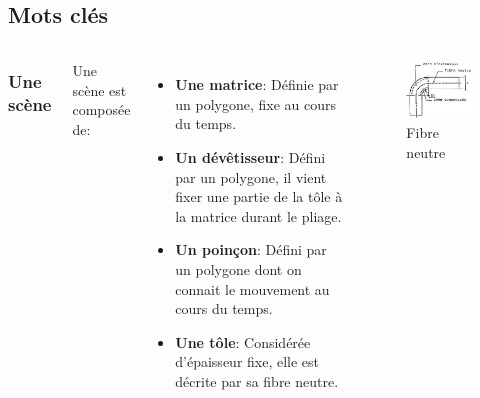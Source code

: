 \documentclass{beamer}
\begin{document}
\subsection{Mots clés}
\begin{frame}
    \begin{columns}
        \frametitle{Une scène}
        Une scène est composée de:
        \begin{itemize}
            \item \textbf{Une matrice}: 
                Définie par un polygone, fixe au cours du temps.
            \item \textbf{Un dévêtisseur}:
                Défini par un polygone, il vient fixer une partie de la tôle à la matrice durant le pliage.
            \item \textbf{Un poinçon}:
                Défini par un polygone dont on connait le mouvement au cours du temps.
            \item \textbf{Une tôle}:
                Considérée d'épaisseur fixe, elle est décrite par sa fibre neutre.
        \end{itemize}
        \begin{figure}
            \includegraphics[width=\textwidth]{img/fibreNeutre.jpg}
            \caption{Fibre neutre}
            \label{FibreNeudre}
        \end{figure}
    \end{columns}
\end{frame}
\end{document}
